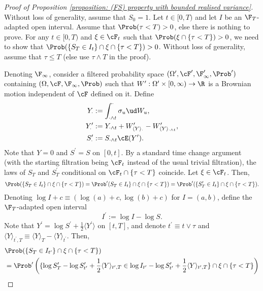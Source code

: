 \documentclass[11pt]{article}
\begin{document}
\begin{proof}[Proof of Proposition \ref{proposition: (FS) property with bounded realised variance}]

Without loss of generality, assume that $S_0 = 1$. Let $t \in [0,T)$ and let $I$ be an $\F_T$-adapted open interval. Assume that $\Prob(\tau < T) > 0$, else there is nothing to prove. For any $t \in [0,T)$ and $\xi \in \cF_t$ such that $\Prob( \xi \cap \{ \tau < T \} ) > 0$, we need to show that $\Prob( \{  S_T \in I_t \} \cap \xi \cap \{ \tau < T\}) > 0$. Without loss of generality, assume that $\tau \leq T$ (else use $\tau \wedge T$ in the proof).

Denoting $\F_\infty$, consider a filtered probability space $(\Omega^\prime, \cF^\prime, \F^\prime_\infty, \Prob^\prime)$ containing $(\Omega, \cF, \F_\infty, \Prob)$ such that $W^\prime: \Omega^\prime \times [0,\infty) \to \R$ is a Brownian motion independent of $\cF$ defined on it. Define 
\begin{align*}
Y_\cdot &:=  \int_{\cdot \wedge t}^\cdot \sigma_u \ud W_u, \\
Y^\prime_\cdot &:= Y_{\cdot \wedge t} + W^\prime_{\langle Y \rangle_\cdot} - W^\prime_{\langle Y \rangle_{\cdot \wedge t}}, \\
S^\prime_\cdot &:= S_{\cdot \wedge t} \cE(Y^\prime).
\end{align*}
Note that $Y = 0$ and $S^\prime = S$ on $[0, t]$. By a standard time change argument (with the starting filtration being $\cF_t$ instead of the usual trivial filtration), the laws of $S_T$ and $S^\prime_T$ conditional on $\cF_t \cap \{ \tau < T \}$ coincide. Let $\xi \in \cF_t$. Then,
$$
\Prob( \{ S_T \in I_t \} \cap \xi \cap \{ \tau < T \} ) = \Prob^\prime( S_T \in I_t \} \cap \xi \cap \{ \tau < T \} ) = \Prob^\prime( \{ S^\prime_T \in I_t \} \cap \xi \cap \{ \tau < T \}).
$$
Denoting $\log I + c \equiv (\log(a) + c, \log(b) + c)$ for $I = (a,b)$, define the $\F_T$-adapted open interval
$$
I^\prime := \log I - \log S.
$$
Note that $Y^\prime = \log S^\prime + \frac{1}{2} \langle Y^\prime \rangle$ on $[t, T]$, and denote $t^\prime \equiv t \vee \tau$ and $\langle Y \rangle_{t^\prime,T} \equiv \langle Y \rangle_T - \langle Y \rangle_{t^\prime}$. Then,
\begin{align*}
&\Prob( \{ S_T \in I_{t^\prime} \} \cap \xi \cap \{ \tau < T \} ) \\
&= \Prob^\prime \left( \{ \log S^\prime_T - \log S^\prime_{t^\prime} + \frac{1}{2} \langle Y \rangle_{t^\prime,T} \in \log I_{t^\prime} - \log S^\prime_{t^\prime} + \frac{1}{2} \langle Y \rangle_{t^\prime,T} \} \cap \xi \cap \{ \tau < T \} \right) \\

\end{align*}
\end{proof}
\end{document}
